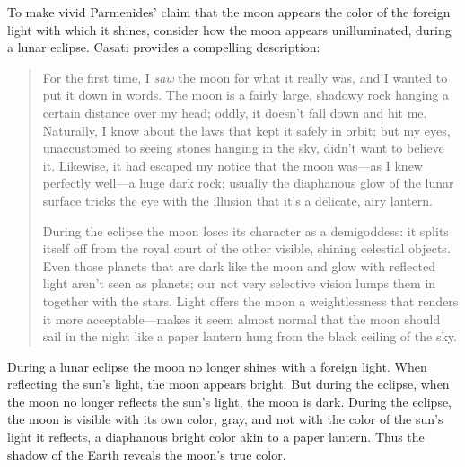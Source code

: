 To make vivid Parmenides' claim that the moon appears the color of the foreign light with which it shines, consider how the moon appears unilluminated, during a lunar eclipse. Casati provides a compelling description:
\begin{quotation}
	\noindent For the first time, I \emph{saw} the moon for what it really was, and I wanted to put it down in words. The moon is a fairly large, shadowy rock hanging a certain distance over my head; oddly, it doesn't fall down and hit me. Naturally, I know about the laws that kept it safely in orbit; but my eyes, unaccustomed to seeing stones hanging in the sky, didn't want to believe it. Likewise, it had escaped my notice that the moon was---as I knew perfectly well---a huge dark rock; usually the diaphanous glow of the lunar surface tricks the eye with the illusion that it's a delicate, airy lantern.
	
	During the eclipse the moon loses its character as a demigoddess: it splits itself off from the royal court of the other visible, shining celestial objects. Even those planets that are dark like the moon and glow with reflected light aren't seen as planets; our not very selective vision lumps them in together with the stars. Light offers the moon a weightlessness that renders it more acceptable---makes it seem almost normal that the moon should sail in the night like a paper lantern hung from the black ceiling of the sky. \citep[3--4]{Casati:2003aa}
\end{quotation}
During a lunar eclipse the moon no longer shines with a foreign light. When reflecting the sun's light, the moon appears bright. But during the eclipse, when the moon no longer reflects the sun's light, the moon is dark. During the eclipse, the moon is visible with its own color, gray, and not with the color of the sun's light it reflects, a diaphanous bright color akin to a paper lantern. Thus the shadow of the Earth reveals the moon's true color.

